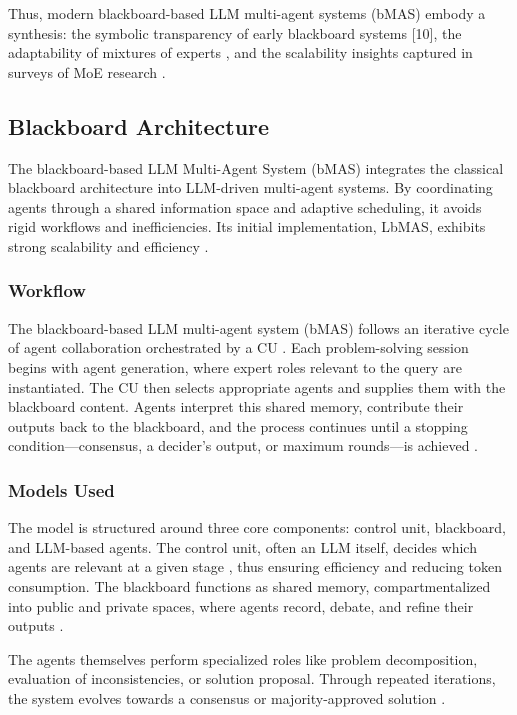 \documentclass[conference]{IEEEtran}
\begin{document}
Thus, modern blackboard-based LLM multi-agent systems (bMAS) \cite{hanllm} embody a synthesis: the symbolic transparency of early blackboard systems [10], the adaptability of mixtures of experts \cite{amoe}\cite{moe}, and the scalability insights captured in surveys of MoE research \cite{moe}\cite{smoe}.

\subsection{Blackboard Architecture}

The blackboard-based LLM Multi-Agent System (bMAS) integrates the classical blackboard architecture \cite{nii1986blackboard} into LLM-driven multi-agent systems. By coordinating agents through a shared information space and adaptive scheduling, it avoids rigid workflows and inefficiencies. Its initial implementation, LbMAS, exhibits strong scalability and efficiency \cite{hanllm}.

\subsubsection{Workflow}
The blackboard-based LLM multi-agent system (bMAS) follows an iterative cycle of agent collaboration orchestrated by a CU \cite{nii1986blackboard}. Each problem-solving session begins with agent generation, where expert roles relevant to the query are instantiated. The CU then selects appropriate agents and supplies them with the blackboard content. Agents interpret this shared memory, contribute their outputs back to the blackboard, and the process continues until a stopping condition---consensus, a decider’s output, or maximum rounds---is achieved \cite{hanllm}.  

\subsubsection{Models Used}
The model is structured around three core components: control unit, blackboard, and LLM-based agents. The control unit, often an LLM itself, decides which agents are relevant at a given stage \cite{hanllm}, thus ensuring efficiency and reducing token consumption. The blackboard functions as shared memory, compartmentalized into public and private spaces, where agents record, debate, and refine their outputs \cite{nii1986blackboard}.  

The agents themselves perform specialized roles like problem decomposition, evaluation of inconsistencies, or solution proposal. Through repeated iterations, the system evolves towards a consensus or majority-approved solution \cite{hanllm}.
\end{document}
